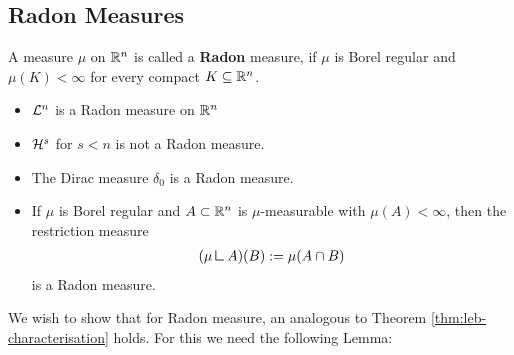 \subsection{Radon Measures}

\begin{dfn}[]
  A measure $\mu$ on $\mathbb{R}^{n}$ is called a \textbf{Radon} measure, if $\mu$ is Borel regular and $\mu(K) < \infty$ for every compact $K \subseteq \mathbb{R}^{n}$.
\end{dfn}

\begin{ex}[]
\phantom{a}
\begin{itemize}
  \item $\mathcal{L}^{n}$ is a Radon measure on $\mathbb{R}^{n}$
  \item $\mathcal{H}^{s}$ for $s < n$ is not a Radon measure.
  \item The Dirac measure $\delta_0$ is a Radon measure.
  \item If $\mu$ is Borel regular and $A \subset \mathbb{R}^{n}$ is $\mu$-measurable with $\mu(A) < \infty$, then the restriction measure
    \begin{align*}
      (\mu \mres A)(B) := \mu(A \cap B)
    \end{align*}
    is a Radon measure.
\end{itemize}
\end{ex}

We wish to show that for Radon measure, an analogous to Theorem \ref{thm:leb-characterisation} holds.
For this we need the following Lemma:


